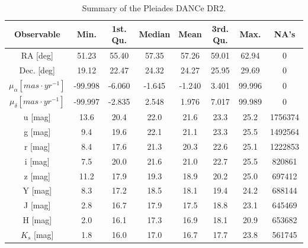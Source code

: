 \begin{table}[htdp]
\caption{Summary of the Pleiades DANCe DR2.}
\begin{center}
\begin{tabular}{|c|c|c|c|c|c|c|c|}
\hline
Observable & Min. & 1st. Qu. & Median & Mean & 3rd. Qu. & Max. & NA's \\
\hline
\hline
RA [deg]&51.23 & 55.40 & 57.35 & 57.26 & 59.01 & 62.94 & 0\\
Dec. [deg] &19.12 &22.47 & 24.32 & 24.27  & 25.95 & 29.69 &0\\
$\mu_{\alpha} [mas\cdot yr^{-1}]$&-99.998& -6.060& -1.645& -1.240&3.401&99.996&0\\
$\mu_{\delta} [mas\cdot yr^{-1}]$&-99.997& -2.835&  2.548&  1.976&  7.017&99.989&0\\
u [mag]&13.6&20.4 &22.0 &21.6&23.3&25.2&1756374\\
g [mag]& 9.4   &19.6   &22.1   &21.1   &23.3   &25.5 &1492564\\
r [mag] &  8.4  &17.6   &21.3   &20.3   &22.6   &25.1   &1222853\\
i [mag] &  7.5  &20.0  &21.6  &21.0  &22.7  &25.5  &820861\\
z [mag]&11.2  &17.9  &19.3  &18.9  &20.2  &25.0  &697412\\
Y [mag]& 8.3  &17.2  &18.5  &18.1  &19.4  &24.2  &688144\\
J [mag]& 2.8  &16.7  &17.9  &17.5  &18.8  &23.1  &645469\\
H [mag]& 2.0  &16.1  &17.3  &16.9  &18.1  &20.9  &653682\\
$K_s$ [mag]& 1.8 &16.0&  17.0  &16.7  &17.7  &23.8  &561745\\
\hline
\end{tabular}
\end{center}
\label{tab:DR2properties}
\end{table}%

